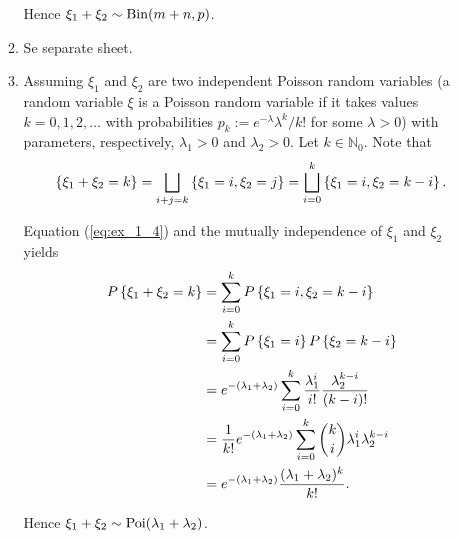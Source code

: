 \begin{enumerate}[label = \textbf{Exercise \arabic*.},wide = 0pt, itemsep=1.5ex]
\begin{enumerate}[label = \arabic*.,wide = 0pt, itemsep=1.5ex]
				Hence $\xi_1 + \xi_2 \sim \operatorname{Bin}(m + n,p)$.


			\item Se separate sheet.
			\item Assuming $\xi_1$ and $\xi_2$ are two independent Poisson random variables (a random variable $\xi$ is a Poisson random variable if it takes values $k = 0,1,2,\dots$ with probabilities $p_k := e^{-\lambda}\lambda^k/k!$ for some $\lambda > 0$) with parameters, respectively, $\lambda_1 > 0$ and $\lambda_2 > 0$. Let $k \in \mathbb{N}_0$. Note that 
				\begin{equation}
					\cbr[0]{\xi_1 + \xi_2 = k} = \bigsqcup_{i + j = k}\cbr[0]{\xi_1 = i, \xi_2 = j} = \bigsqcup_{i = 0}^k \cbr[0]{\xi_1 = i, \xi_2 = k - i}.
					\label{eq:ex_1_4}
				\end{equation}
		
				Equation (\ref{eq:ex_1_4}) and the mutually independence of $\xi_1$ and $\xi_2$ yields
				\begin{align*}
					P\cbr[0]{\xi_1 + \xi_2 = k} &= \sum_{i = 0}^k P\cbr[0]{\xi_1 = i, \xi_2 = k - i}\\
					&= \sum_{i = 0}^k P\cbr[0]{\xi_1 = i}P\cbr[0]{\xi_2 = k - i}\\
					&= e^{-(\lambda_1 + \lambda_2)}\sum_{i = 0}^k \frac{\lambda_1^i}{i!}\frac{\lambda_2^{k - i}}{(k - i)!}\\
					&=  \frac{1}{k!}e^{-(\lambda_1 + \lambda_2)}\sum_{i = 0}^k {k \choose i} \lambda_1^i\lambda_2^{k - i}\\
					&= e^{-(\lambda_1 + \lambda_2)}\frac{(\lambda_1 + \lambda_2)^k}{k!}.
				\end{align*}

				Hence $\xi_1 + \xi_2 \sim \operatorname{Poi}(\lambda_1 + \lambda_2)$.
		\end{enumerate}
\end{enumerate}
\printbibliography

